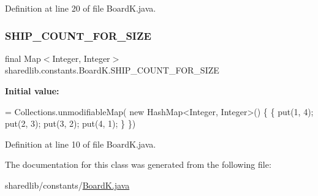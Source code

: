 Definition at line 20 of file Board\+K.\+java.

\hypertarget{classsharedlib_1_1constants_1_1_board_k_a53904d51affb4ad3b367258585c91f70}{}\label{classsharedlib_1_1constants_1_1_board_k_a53904d51affb4ad3b367258585c91f70} 
\subsubsection{\texorpdfstring{S\+H\+I\+P\+\_\+\+C\+O\+U\+N\+T\+\_\+\+F\+O\+R\+\_\+\+S\+I\+ZE}{SHIP\_COUNT\_FOR\_SIZE}}
{\footnotesize\ttfamily final Map$<$Integer, Integer$>$ sharedlib.\+constants.\+Board\+K.\+S\+H\+I\+P\+\_\+\+C\+O\+U\+N\+T\+\_\+\+F\+O\+R\+\_\+\+S\+I\+ZE\hspace{0.3cm}{\ttfamily [static]}}

{\bfseries Initial value\+:}
\begin{DoxyCode}
= Collections.unmodifiableMap(
                    \textcolor{keyword}{new} HashMap<Integer, Integer>() \{
                \{
                    put(1, 4);
                    put(2, 3);
                    put(3, 2);
                    put(4, 1);
                \}
            \})
\end{DoxyCode}


Definition at line 10 of file Board\+K.\+java.



The documentation for this class was generated from the following file\+:\begin{DoxyCompactItemize}
\item 
sharedlib/constants/\hyperlink{_board_k_8java}{Board\+K.\+java}\end{DoxyCompactItemize}
